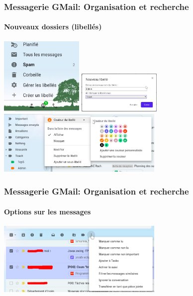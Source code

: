 \documentclass[xcolor=table]{beamer}
\begin{document}
\begin{frame}
\frametitle{Messagerie GMail: Organisation et recherche}
\framesubtitle{Nouveaux dossiers (libellés)}
\includegraphics[width=4cm]{..//img/Bweb02-ri-gmail/gmail-label1.png}
\includegraphics[width=4cm]{..//img/Bweb02-ri-gmail/gmail-label2.png}
\includegraphics[width=8cm]{..//img/Bweb02-ri-gmail/gmail-label3.png}
\end{frame}

\begin{frame}
\frametitle{Messagerie GMail: Organisation et recherche}
\framesubtitle{Options sur les messages}

\includegraphics[width=8cm]{..//img/Bweb02-ri-gmail/gmail-options.png}

\end{frame}
\end{document}
